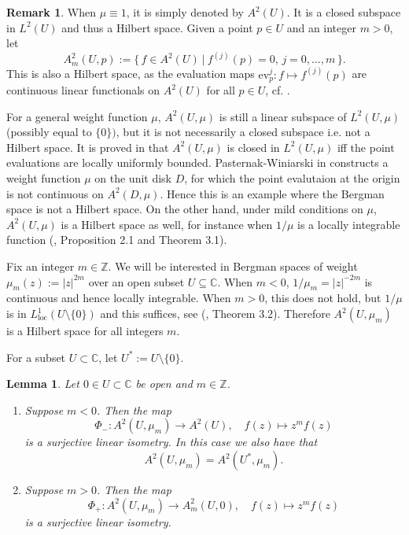 \documentclass[11pt]{amsart}
\newtheorem{lemma}[theorem]{Lemma}
\theoremstyle{definition}
\newtheorem{remark}[theorem]{Remark}
\newcommand{\bZ}{{\mathbb Z}}
\newcommand{\bC}{{\mathbb C}}
\begin{document}
      
  \begin{remark}\label{rem:eltunos}
      When $\mu\equiv1$, it is simply denoted by $A^2(U)$. It is a closed subspace in $L^2(U)$ and thus a Hilbert space. Given a point $p \in U$ and an integer $m>0$, let
  $$
    A^2_m(U, p):=\{ \, f\in A^2(U) \ | \ f^{(j)}(p)=0, \, j=0,\dots, m \, \}.
$$
This is also a Hilbert space, as the evaluation maps $\text{ev}^j_p:f\mapsto f^{(j)}(p)$ are continuous linear functionals on 
$A^2(U)$ for all $p \in U$, cf. \cite{HKZ}.
  \end{remark}
For a general weight function $\mu$,
  $A^2(U,\mu)$ is still a linear subspace of  $L^2(U,\mu)$ (possibly equal to $\{0\})$,
but it is not necessarily a closed subspace i.e. not a Hilbert space. It is proved in \cite{HQW21} that $A^2(U,\mu)$ is closed in $L^2(U,\mu)$ iff the point evaluations are locally uniformly bounded. Pasternak-Winiarski in \cite{PW92} constructs a weight function  $\mu$ on the unit disk $D$, for which the point evalutaion at the origin is not continuous on  $A^2(D,\mu)$. Hence this is an example where the Bergman space is not a Hilbert space. On the other hand, under mild conditions on $\mu$, $A^2(U,\mu)$ is a Hilbert space as well, for instance when $1/\mu$ is a locally integrable function (\cite{PW90}, Proposition 2.1 and Theorem 3.1).

Fix an integer $m \in \bZ$. We will be interested in Bergman spaces of weight $\mu_m(z):=|z|^{2m}$ over an open subset $U \subseteq \bC$. When $m<0$, $1/\mu_m=|z|^{-2m}$
is continuous and hence locally integrable. When $m>0$, this does not hold, but 
$1/\mu$ is in $L^1_{\text{loc}}(U\setminus \{0\})$ and this suffices, see
(\cite{PW90}, Theorem 3.2). Therefore $A^2(U,\mu_m)$ is a Hilbert space for all integers $m$.\vspace{3mm}

\noindent For a subset $U\subset\bC$, let $U^*:=U\setminus \{0\}$. 

\begin{lemma}\label{lem:korlap}
     Let $0 \in U\subset\bC$ be open and  $m\in \mathbb{Z}$.
     \begin{enumerate}
        \item Suppose $m < 0$. Then the map
         $$\Phi_- : A^2(U,\mu_m) \to A^2(U), \quad f(z) \mapsto z^mf(z)$$
         is a surjective linear isometry. In this case we also have that
            $$ A^2(U,\mu_m)=A^2(U^*,\mu_m).$$
         \item Suppose $m > 0$. Then the map
         $$\Phi_+ : A^2(U,\mu_m) \to A^2_m(U,0), \quad f(z) \mapsto z^mf(z)$$
         is a surjective linear isometry.
     \end{enumerate}
     
\end{lemma}
\end{document}
